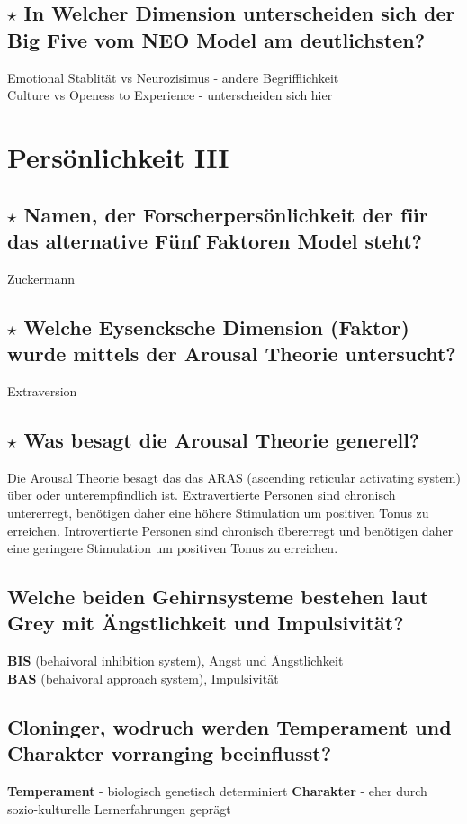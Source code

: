 \documentclass[a4paper,9pt,DIV=14]{scrartcl}
\begin{document}
\subsection{$\star$ In Welcher Dimension unterscheiden sich der Big Five vom NEO Model am deutlichsten?} %
    Emotional Stablität vs Neurozisimus - andere Begrifflichkeit\\
    Culture vs Openess to Experience - unterscheiden sich hier

\section{Persönlichkeit III}
\subsection{$\star$ Namen, der Forscherpersönlichkeit der für das alternative Fünf Faktoren Model steht?} %
Zuckermann
\subsection{$\star$ Welche Eysencksche Dimension (Faktor) wurde mittels der Arousal Theorie untersucht?} %
Extraversion
\subsection{$\star$ Was besagt die Arousal Theorie generell?} %
Die Arousal Theorie besagt das das ARAS (ascending reticular activating system) über oder unterempfindlich ist. Extravertierte Personen sind chronisch untererregt, benötigen daher eine höhere Stimulation um positiven Tonus zu erreichen. Introvertierte Personen sind chronisch übererregt und benötigen daher eine geringere Stimulation um positiven Tonus zu erreichen.
\subsection{Welche beiden Gehirnsysteme bestehen laut Grey mit Ängstlichkeit und Impulsivität?}
    \textbf{BIS} (behaivoral inhibition system), Angst und Ängstlichkeit\\
    \textbf{BAS} (behaivoral approach system), Impulsivität\\
\subsection{Cloninger, wodruch werden Temperament und Charakter vorranging beeinflusst?}
    \textbf{Temperament} - biologisch genetisch determiniert
    \textbf{Charakter} - eher durch sozio-kulturelle Lernerfahrungen geprägt
\end{document}
